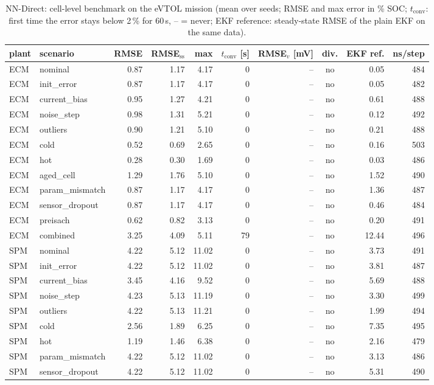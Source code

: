 \begin{table}[H]\centering\footnotesize\setlength{\tabcolsep}{4pt}
\caption{NN-Direct: cell-level benchmark on the eVTOL mission (mean over seeds; RMSE and max error in \% SOC; $t_\mathrm{conv}$: first time the error stays below 2\,\% for 60\,s, -- = never; EKF reference: steady-state RMSE of the plain EKF on the same data).}\label{tab:cell_NNDirect}
\begin{tabular}{llrrrrrcrr}\toprule
plant & scenario & RMSE & RMSE$_\mathrm{ss}$ & max & $t_\mathrm{conv}$ [s] & RMSE$_v$ [mV] & div. & EKF ref. & ns/step \\ \midrule
ECM & nominal & 0.87 & 1.17 & 4.17 & 0 & -- & no & 0.05 & 484 \\
ECM & init\_error & 0.87 & 1.17 & 4.17 & 0 & -- & no & 0.05 & 482 \\
ECM & current\_bias & 0.95 & 1.27 & 4.21 & 0 & -- & no & 0.61 & 488 \\
ECM & noise\_step & 0.98 & 1.31 & 5.21 & 0 & -- & no & 0.12 & 492 \\
ECM & outliers & 0.90 & 1.21 & 5.10 & 0 & -- & no & 0.21 & 488 \\
ECM & cold & 0.52 & 0.69 & 2.65 & 0 & -- & no & 0.16 & 503 \\
ECM & hot & 0.28 & 0.30 & 1.69 & 0 & -- & no & 0.03 & 486 \\
ECM & aged\_cell & 1.29 & 1.76 & 5.10 & 0 & -- & no & 1.52 & 490 \\
ECM & param\_mismatch & 0.87 & 1.17 & 4.17 & 0 & -- & no & 1.36 & 487 \\
ECM & sensor\_dropout & 0.87 & 1.17 & 4.17 & 0 & -- & no & 0.46 & 484 \\
ECM & preisach & 0.62 & 0.82 & 3.13 & 0 & -- & no & 0.20 & 491 \\
ECM & combined & 3.25 & 4.09 & 5.11 & 79 & -- & no & 12.44 & 496 \\
\midrule
SPM & nominal & 4.22 & 5.12 & 11.02 & 0 & -- & no & 3.73 & 491 \\
SPM & init\_error & 4.22 & 5.12 & 11.02 & 0 & -- & no & 3.81 & 487 \\
SPM & current\_bias & 3.45 & 4.16 & 9.52 & 0 & -- & no & 5.69 & 488 \\
SPM & noise\_step & 4.23 & 5.13 & 11.19 & 0 & -- & no & 3.30 & 499 \\
SPM & outliers & 4.22 & 5.13 & 11.21 & 0 & -- & no & 1.99 & 494 \\
SPM & cold & 2.56 & 1.89 & 6.25 & 0 & -- & no & 7.35 & 495 \\
SPM & hot & 1.19 & 1.46 & 6.38 & 0 & -- & no & 2.16 & 479 \\
SPM & param\_mismatch & 4.22 & 5.12 & 11.02 & 0 & -- & no & 3.13 & 486 \\
SPM & sensor\_dropout & 4.22 & 5.12 & 11.02 & 0 & -- & no & 5.31 & 490 \\
\bottomrule\end{tabular}\end{table}
